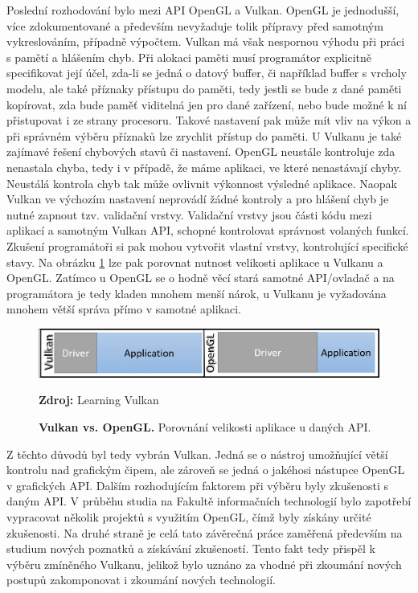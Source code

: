 Poslední rozhodování bylo mezi API OpenGL a Vulkan. OpenGL je jednodušší, více zdokumentované a především nevyžaduje tolik přípravy před samotným vykreslováním, případně výpočtem. Vulkan má však nespornou výhodu při práci s pamětí a hlášením chyb. Při alokaci paměti musí programátor explicitně specifikovat její účel, zda-li se jedná o datový buffer, či například buffer s vrcholy modelu, ale také příznaky přístupu do paměti, tedy jestli se bude z dané paměti kopírovat, zda bude paměť viditelná jen pro dané zařízení, nebo bude možné k ní přistupovat i ze strany procesoru. Takové nastavení pak může mít vliv na výkon a při správném výběru příznaků lze zrychlit přístup do paměti. U Vulkanu je také zajímavé řešení chybových stavů či nastavení. OpenGL neustále kontroluje zda nenastala chyba, tedy i v případě, že máme aplikaci, ve které nenastávají chyby. Neustálá kontrola chyb tak může ovlivnit výkonnost výsledné aplikace. Naopak Vulkan ve výchozím nastavení neprovádí žádné kontroly a pro hlášení chyb je nutné zapnout tzv. validační vrstvy. Validační vrstvy jsou části kódu mezi aplikací a samotným Vulkan API, schopné kontrolovat správnost volaných funkcí. Zkušení programátoři si pak mohou vytvořit vlastní vrstvy, kontrolující specifické stavy. Na obrázku \ref{fig:VulXogl} lze pak porovnat nutnost velikosti aplikace u Vulkanu a OpenGL. Zatímco u OpenGL se o hodně věcí stará samotné API/ovladač a na programátora je tedy kladen mnohem menší nárok, u Vulkanu je vyžadována mnohem větší správa přímo v samotné aplikaci. \cite{singh2016learning} \cite{VulkanTut}

\begin{figure}[hbt]
	\centering
	\captionsetup{justification=centering}
	\includegraphics[scale=0.6]{obrazky-figures/vulkanXogl.jpg}
	\caption{\textbf{Vulkan vs. OpenGL.} Porovnání velikosti aplikace u daných API. }
	\textbf{Zdroj: } Learning Vulkan \cite{singh2016learning}
	\label{fig:VulXogl}
\end{figure}

Z těchto důvodů byl tedy vybrán Vulkan. Jedná se o nástroj umožňující větší kontrolu nad grafickým čipem, ale zároveň se jedná o jakéhosi nástupce OpenGL v grafických API. Dalším rozhodujícím faktorem při výběru byly zkušenosti s daným API. V průběhu studia na Fakultě informačních technologií bylo zapotřebí vypracovat několik projektů s využitím OpenGL, čímž byly získány určité zkušenosti. Na druhé straně je celá tato závěrečná práce zaměřená především na studium nových poznatků a získávání zkušeností. Tento fakt tedy přispěl k výběru zmíněného Vulkanu, jelikož bylo uznáno za vhodné při zkoumání nových postupů zakomponovat i zkoumání nových technologií.

